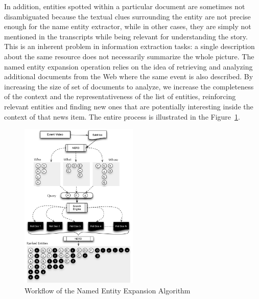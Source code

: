 \documentclass[a4paper,11pt]{report}
\begin{document}
In addition, entities spotted within a particular document are sometimes not disambiguated because the textual clues surrounding the entity are not precise enough for the name entity extractor, while in other cases, they are simply not mentioned in the transcripts while being relevant for understanding the story. This is an inherent problem in information extraction tasks: a single description about the same resource does not necessarily summarize the whole picture. The named entity expansion operation relies on the idea of retrieving and analyzing additional documents from the Web where the same event is also described. By increasing the size of set of documents to analyze, we increase the completeness of the context and the representativeness of the list of entities, reinforcing relevant entities and finding new ones that are potentially interesting inside the context of that news item. The entire process is illustrated in the Figure~\ref{fig:namedEntityExpansion}.

\begin{figure}[h!]
\centering
\includegraphics[width=0.5\textwidth]{figure/ExpansionDiagram}
\caption{Workflow of the Named Entity Expansion Algorithm}
\label{fig:namedEntityExpansion}%
\end{figure}
\end{document}
